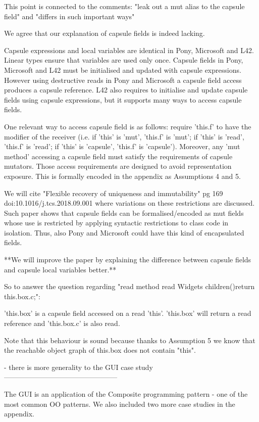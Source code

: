 This point is connected to the comments: "leak out a mut alias to the capsule field" and "differs in such important ways"

We agree that our explanation of capsule fields is indeed lacking.

Capsule expressions and local variables are identical in Pony, Microsoft and L42.
Linear types ensure that variables are used only once.
Capsule fields in Pony, Microsoft and L42 must be initialised and updated with capsule expressions.
However using destructive reads in Pony and Microsoft a capsule field access produces a capsule reference.
L42 also requires to initialise and update capsule fields using capsule expressions,
but it supports many ways to access capsule fields.

One relevant way to access capsule field is as follows: require 'this.f' to have the modifier of the receiver
(i.e. if 'this' is 'mut', 'this.f' is 'mut'; if 'this' is 'read', 'this.f' is 'read'; if 'this' is 'capsule', 'this.f' is 'capsule').
Moreover, any 'mut method' accessing a capsule field must satisfy the requirements of capsule mutators.
Those access requirements are designed to avoid representation exposure.
This is formally encoded in the appendix as Assumptions 4 and 5.

We will cite "Flexible recovery of uniqueness and immutability" 
pg 169 doi:10.1016/j.tcs.2018.09.001 where variations on these restrictions are discussed.
Such paper shows that capsule fields can be formalised/encoded as mut fields whose use is restricted by applying syntactic restrictions to class code in isolation.
Thus, also Pony and Microsoft could have this kind of encapsulated fields.

**We will improve the paper by explaining the difference between capsule fields and capsule local variables better.**


So to answer the question regarding "read method read Widgets children(){return this.box.c;}":

'this.box' is a capsule field accessed on a read 'this'. 'this.box' will return a read reference
and 'this.box.c' is also read.

Note that this behaviour is sound because thanks to Assumption 5 we know that the reachable object graph
of this.box does not contain "this".


- there is more generality to the GUI case study
------------------------------------------------

The GUI is an application of the Composite programming pattern - one of the most common OO patterns.
We also included two more case studies in the appendix.

